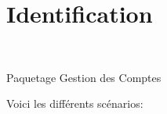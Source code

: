 	\section{Identification}

\begin{center}
\\
\par{Paquetage Gestion des Comptes}
\end{center}
Voici les diff{\'e}rents sc{\'e}narios:\\

